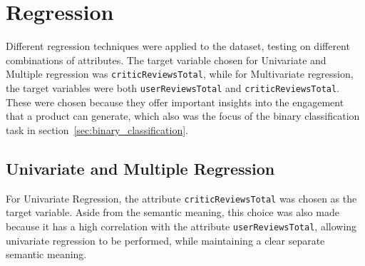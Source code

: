 \chapter{Regression}
\label{ch:capitolo4}
Different regression techniques were applied to the dataset, testing
on different combinations of attributes. The target variable chosen for
Univariate and Multiple regression was \texttt{criticReviewsTotal}, while
for Multivariate regression, the target variables were both
\texttt{userReviewsTotal} and \texttt{criticReviewsTotal}.
These were chosen because they offer important insights into the engagement
that a product can generate, which also was the focus of the binary
classification task in section~\ref{sec:binary_classification}.


\section{Univariate and Multiple Regression}
For Univariate Regression, the attribute
\texttt{criticReviewsTotal} was chosen
as the target variable. Aside from the semantic meaning, this choice was also made
because it has a high correlation
with the attribute \texttt{userReviewsTotal}, allowing univariate regression
to be performed, while maintaining a clear separate semantic meaning.

